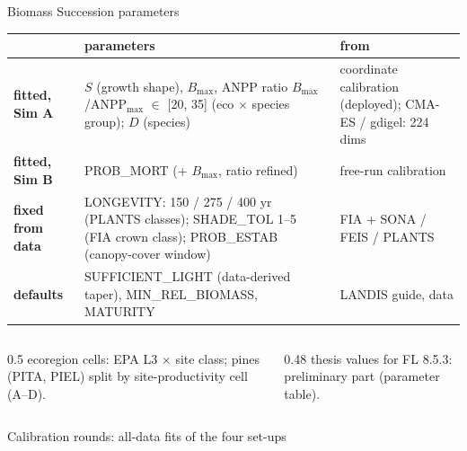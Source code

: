 

\begin{frame}{Biomass Succession parameters}
\footnotesize
\renewcommand{\arraystretch}{1.2}
\begin{tabularx}{\textwidth}{@{}>{\bfseries}p{3.0cm}X>{\raggedright\arraybackslash}p{4.0cm}@{}}
\toprule
 & parameters & from \\
\midrule
fitted, Sim A & $S$ (growth shape), $B_{\max}$, ANPP ratio $B_{\max}$/ANPP$_{\max}$ $\in$ [20, 35] (eco $\times$ species group); $D$ (species) & coordinate calibration (deployed); CMA-ES / gdigel: 224 dims \\
fitted, Sim B & PROB\_MORT (+ $B_{\max}$, ratio refined) & free-run calibration \\
fixed from data & LONGEVITY: 150 / 275 / 400 yr (PLANTS classes); SHADE\_TOL 1–5 (FIA crown class); PROB\_ESTAB (canopy-cover window) & FIA + SONA / FEIS / PLANTS \\
defaults & SUFFICIENT\_LIGHT (data-derived taper), MIN\_REL\_BIOMASS, MATURITY & LANDIS guide, data \\
\bottomrule
\end{tabularx}

\medskip
\begin{columns}[T]
\begin{column}{0.5\textwidth}
\footnotesize ecoregion cells: EPA L3 $\times$ site class; pines (PITA, PIEL) split by site-productivity cell (A–D).
\end{column}
\begin{column}{0.48\textwidth}
\footnotesize thesis values for FL 8.5.3: preliminary part (parameter table).
\end{column}
\end{columns}
\end{frame}

\begin{frame}{Calibration rounds: all-data fits of the four set-ups}
\end{frame}


